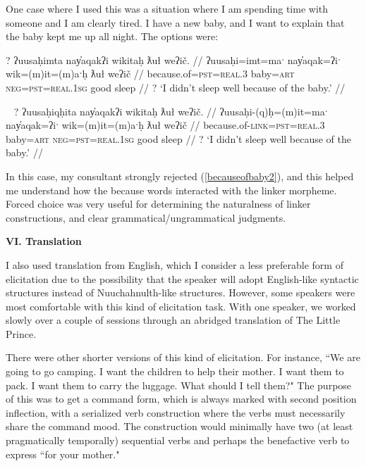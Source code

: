 One case where I used this was a situation where I am spending time with someone and I am clearly tired. I have a new baby, and I want to explain that the baby kept me up all night. The options were:

\ex \label{becauseofbaby1}
\begingl
\glpreamble ? ʔuusaḥimta nay̓aqakʔi wikitaḥ ƛuł weʔič. //
\gla ʔuusaḥi=imt=maˑ nay̓aqak=ʔiˑ wik=(m)it=(m)aˑḥ ƛuł weʔič //
\glb because.of=\textsc{pst}=\textsc{real.3} baby=\textsc{art} \textsc{neg}=\textsc{pst}=\textsc{real.1sg} good sleep //
\glft ? `I didn't sleep well because of the baby.' //
\endgl
\xe

\ex~ \label{becauseofbaby2}
\begingl
\glpreamble ? ʔuusaḥiqḥita nay̓aqakʔi wikitaḥ ƛuł weʔič. //
\gla ʔuusaḥi-(q)ḥ=(m)it=maˑ nay̓aqak=ʔiˑ wik=(m)it=(m)aˑḥ ƛuł weʔič //
\glb because.of-\textsc{link}=\textsc{pst}=\textsc{real.3} baby=\textsc{art} \textsc{neg}=\textsc{pst}=\textsc{real.1sg} good sleep //
\glft ? `I didn't sleep well because of the baby.' //
\endgl
\xe

In this case, my consultant strongly rejected (\ref{becauseofbaby2}), and this helped me understand how the because words interacted with the linker morpheme. Forced choice was very useful for determining the naturalness of linker constructions, and clear grammatical/ungrammatical judgments.

\vspace{8pt}

\noindent \textbf{VI. Translation}

I also used translation from English, which I consider a less preferable form of elicitation due to the possibility that the speaker will adopt English-like syntactic structures instead of Nuuchahnulth-like structures. However, some speakers were most comfortable with this kind of elicitation task. With one speaker, we worked slowly over a couple of sessions through an abridged translation of The Little Prince.

There were other shorter versions of this kind of elicitation. For instance, ``We are going to go camping. I want the children to help their mother. I want them to pack. I want them to carry the luggage. What should I tell them?" The purpose of this was to get a command form, which is always marked with second position inflection, with a serialized verb construction where the verbs must necessarily share the command mood. The construction would minimally have two (at least pragmatically temporally) sequential verbs and perhaps the benefactive verb to express ``for your mother."

